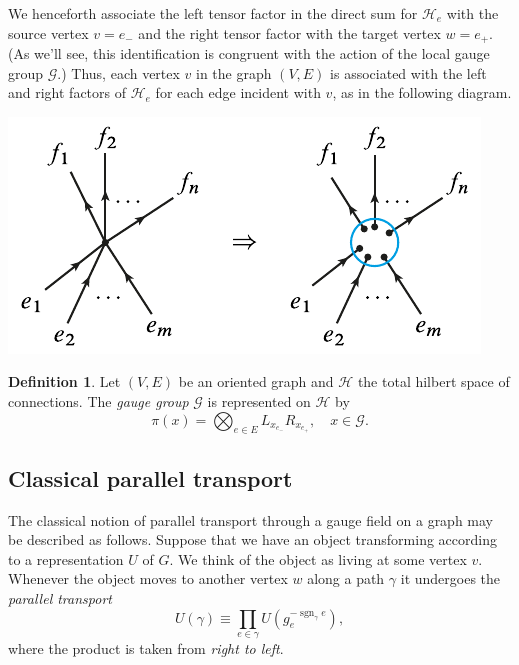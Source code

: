 \documentclass[12pt]{amsart}
\newcommand{\sgn}{\operatorname{sgn}}
\theoremstyle{definition}
\newtheorem{definition}[theorem]{Definition}
\theoremstyle{remark}
\numberwithin{equation}{section}
\begin{document}
We henceforth associate the left tensor factor in the direct sum for $\mathcal{H}_e$ with the source vertex $v = e_-$  and the right tensor factor with the target vertex $w = e_+$. (As we'll see, this identification is congruent with the action of the local gauge group $\mathcal{G}$.) Thus, each vertex $v$ in the graph $(V,E)$ is associated with the left and right factors of $\mathcal{H}_e$ for each edge incident with $v$, as in the following diagram.
\begin{center}
	\includegraphics{vertexspace.pdf}
\end{center}

\begin{definition}
	Let $(V,E)$ be an oriented graph and $\mathcal{H}$ the total hilbert space of connections. The \emph{gauge group} $\mathcal{G}$ is represented on $\mathcal{H}$ by 
	\begin{equation}
		\pi(x) = \bigotimes_{e\in E} L_{x_{e_-}}R_{x_{e_+}}, \quad x\in \mathcal{G}.
	\end{equation}
\end{definition}

\subsection{Classical parallel transport}
The classical notion of parallel transport through a gauge field on a graph may be described as follows. Suppose that we have an object transforming according to a representation $U$ of $G$. We think of the object as living at some vertex $v$. Whenever the object moves to another vertex $w$ along a path $\gamma$ it undergoes the \emph{parallel transport}  
\begin{equation}\label{eq:ugamma}
	U(\gamma) \equiv \prod_{e\in \gamma} U(g_{e}^{-\sgn_\gamma{e}}),
\end{equation}
where the product is taken from \emph{right to left}.
\end{document}
